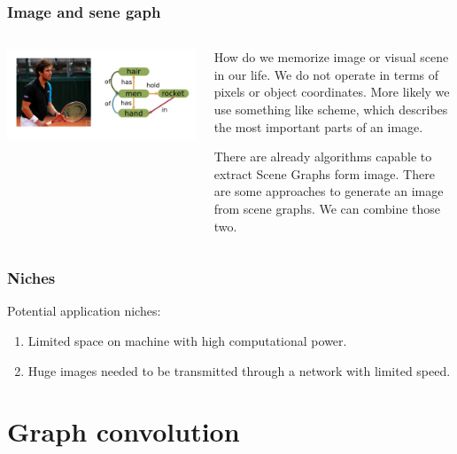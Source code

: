 \documentclass[10pt]{beamer}
\begin{document}
\begin{frame}
    \frametitle{Image and sene gaph}
    \begin{columns}
        \begin{column}{0.5\textwidth}
            \includegraphics[width=\textwidth]{figure/image-and-scene-graph.png}
        \end{column}
        \begin{column}{0.5\textwidth}
            How do we memorize image or visual scene in our life. We do not operate in terms of pixels or object coordinates. More likely we use something like scheme, which describes the most important parts of an image.

            There are already algorithms capable to extract Scene Graphs form image. There are some approaches to generate an image from scene graphs. We can combine those two.
        \end{column}
    \end{columns}
\end{frame}

\begin{frame}
    \frametitle{Niches}
    Potential application niches:

    \begin{enumerate}
        \item Limited space on machine with high computational power.
        \item Huge images needed to be transmitted through a network with limited speed.
    \end{enumerate}
\end{frame}

\section{Graph convolution}
\end{document}

